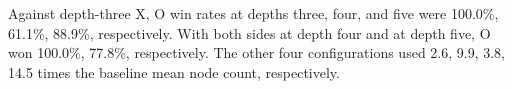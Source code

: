 Against depth-three X, O win rates at depths three, four, and five were 100.0\%, 61.1\%, 88.9\%, respectively. With both sides at depth four and at depth five, O won 100.0\%, 77.8\%, respectively. The other four configurations used 2.6, 9.9, 3.8, 14.5 times the baseline mean node count, respectively.
